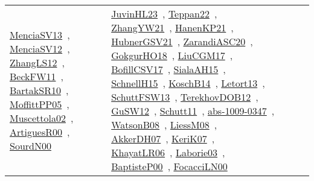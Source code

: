 {\begin{longtable}{lp{3cm}>{\raggedright\arraybackslash}p{6cm}>{\raggedright\arraybackslash}p{6cm}>{\raggedright\arraybackslash}p{8cm}}
\href{works/MenciaSV13.pdf}{MenciaSV13}~\cite{MenciaSV13}, \href{works/MenciaSV12.pdf}{MenciaSV12}~\cite{MenciaSV12}, \href{works/ZhangLS12.pdf}{ZhangLS12}~\cite{ZhangLS12}, \href{works/BeckFW11.pdf}{BeckFW11}~\cite{BeckFW11}, \href{works/BartakSR10.pdf}{BartakSR10}~\cite{BartakSR10}, \href{works/MoffittPP05.pdf}{MoffittPP05}~\cite{MoffittPP05}, \href{works/Muscettola02.pdf}{Muscettola02}~\cite{Muscettola02}, \href{works/ArtiguesR00.pdf}{ArtiguesR00}~\cite{ArtiguesR00}, \href{works/SourdN00.pdf}{SourdN00}~\cite{SourdN00} & \href{works/JuvinHL23.pdf}{JuvinHL23}~\cite{JuvinHL23}, \href{works/Teppan22.pdf}{Teppan22}~\cite{Teppan22}, \href{works/ZhangYW21.pdf}{ZhangYW21}~\cite{ZhangYW21}, \href{works/HanenKP21.pdf}{HanenKP21}~\cite{HanenKP21}, \href{works/HubnerGSV21.pdf}{HubnerGSV21}~\cite{HubnerGSV21}, \href{works/ZarandiASC20.pdf}{ZarandiASC20}~\cite{ZarandiASC20}, \href{works/GokgurHO18.pdf}{GokgurHO18}~\cite{GokgurHO18}, \href{works/LiuCGM17.pdf}{LiuCGM17}~\cite{LiuCGM17}, \href{works/BofillCSV17.pdf}{BofillCSV17}~\cite{BofillCSV17}, \href{works/SialaAH15.pdf}{SialaAH15}~\cite{SialaAH15}, \href{works/SchnellH15.pdf}{SchnellH15}~\cite{SchnellH15}, \href{works/KoschB14.pdf}{KoschB14}~\cite{KoschB14}, \href{works/Letort13.pdf}{Letort13}~\cite{Letort13}, \href{works/SchuttFSW13.pdf}{SchuttFSW13}~\cite{SchuttFSW13}, \href{works/TerekhovDOB12.pdf}{TerekhovDOB12}~\cite{TerekhovDOB12}, \href{works/GuSW12.pdf}{GuSW12}~\cite{GuSW12}, \href{works/Schutt11.pdf}{Schutt11}~\cite{Schutt11}, \href{works/abs-1009-0347.pdf}{abs-1009-0347}~\cite{abs-1009-0347}, \href{works/WatsonB08.pdf}{WatsonB08}~\cite{WatsonB08}, \href{works/LiessM08.pdf}{LiessM08}~\cite{LiessM08}, \href{works/AkkerDH07.pdf}{AkkerDH07}~\cite{AkkerDH07}, \href{works/KeriK07.pdf}{KeriK07}~\cite{KeriK07}, \href{works/KhayatLR06.pdf}{KhayatLR06}~\cite{KhayatLR06}, \href{works/Laborie03.pdf}{Laborie03}~\cite{Laborie03}, \href{works/BaptisteP00.pdf}{BaptisteP00}~\cite{BaptisteP00}, \href{works/FocacciLN00.pdf}{FocacciLN00}~\cite{FocacciLN00}\\

\end{longtable}}
